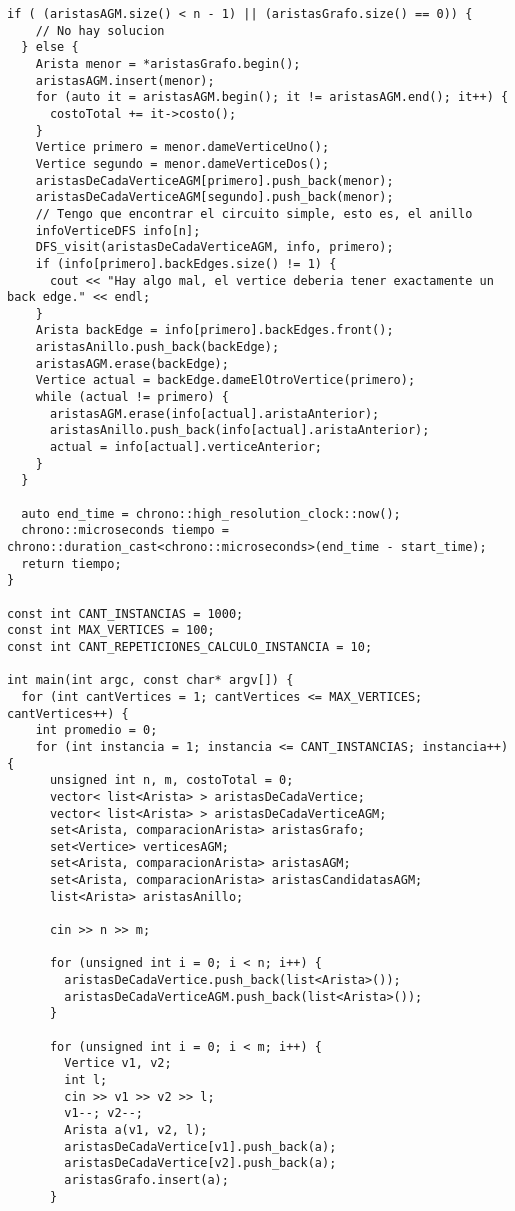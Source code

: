 \begin{lstlisting}[frame=single]
  if ( (aristasAGM.size() < n - 1) || (aristasGrafo.size() == 0)) {
    // No hay solucion
  } else {
    Arista menor = *aristasGrafo.begin();
    aristasAGM.insert(menor);
    for (auto it = aristasAGM.begin(); it != aristasAGM.end(); it++) {
      costoTotal += it->costo();
    }
    Vertice primero = menor.dameVerticeUno();
    Vertice segundo = menor.dameVerticeDos();
    aristasDeCadaVerticeAGM[primero].push_back(menor);
    aristasDeCadaVerticeAGM[segundo].push_back(menor);
    // Tengo que encontrar el circuito simple, esto es, el anillo
    infoVerticeDFS info[n];
    DFS_visit(aristasDeCadaVerticeAGM, info, primero);
    if (info[primero].backEdges.size() != 1) {
      cout << "Hay algo mal, el vertice deberia tener exactamente un back edge." << endl;
    }
    Arista backEdge = info[primero].backEdges.front();
    aristasAnillo.push_back(backEdge);
    aristasAGM.erase(backEdge);
    Vertice actual = backEdge.dameElOtroVertice(primero);
    while (actual != primero) {
      aristasAGM.erase(info[actual].aristaAnterior);
      aristasAnillo.push_back(info[actual].aristaAnterior);
      actual = info[actual].verticeAnterior;
    }
  }
  
  auto end_time = chrono::high_resolution_clock::now();
  chrono::microseconds tiempo = chrono::duration_cast<chrono::microseconds>(end_time - start_time);
  return tiempo;
}

const int CANT_INSTANCIAS = 1000;
const int MAX_VERTICES = 100;
const int CANT_REPETICIONES_CALCULO_INSTANCIA = 10;

int main(int argc, const char* argv[]) {
  for (int cantVertices = 1; cantVertices <= MAX_VERTICES; cantVertices++) {
    int promedio = 0;
    for (int instancia = 1; instancia <= CANT_INSTANCIAS; instancia++) {
      unsigned int n, m, costoTotal = 0;
      vector< list<Arista> > aristasDeCadaVertice;
      vector< list<Arista> > aristasDeCadaVerticeAGM;
      set<Arista, comparacionArista> aristasGrafo;
      set<Vertice> verticesAGM;
      set<Arista, comparacionArista> aristasAGM;
      set<Arista, comparacionArista> aristasCandidatasAGM;
      list<Arista> aristasAnillo;
      
      cin >> n >> m;
      
      for (unsigned int i = 0; i < n; i++) {
        aristasDeCadaVertice.push_back(list<Arista>());
        aristasDeCadaVerticeAGM.push_back(list<Arista>());
      }
      
      for (unsigned int i = 0; i < m; i++) {
        Vertice v1, v2;
        int l;
        cin >> v1 >> v2 >> l;
        v1--; v2--;
        Arista a(v1, v2, l);
        aristasDeCadaVertice[v1].push_back(a);
        aristasDeCadaVertice[v2].push_back(a);
        aristasGrafo.insert(a);
      }
      

\end{lstlisting}
